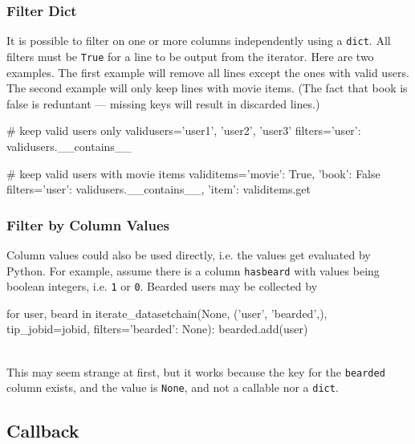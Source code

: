 \subsubsection*{Filter Dict}

It is possible to filter on one or more columns independently using a
\texttt{dict}.  All filters must be \texttt{True} for a line to be
output from the iterator.  Here are two examples.  The first example
will remove all lines except the ones with valid users.  The second
example will only keep lines with movie items.  (The fact that book is
false is reduntant --- missing keys will result in discarded lines.)

\begin{python}
# keep valid users only
validusers={'user1', 'user2', 'user3'}
filters={'user': validusers.__contains__}

# keep valid users with movie items
validitems={'movie': True, 'book': False}
filters={'user': validusers.__contains__, 'item': validitems.get}
\end{python}




\subsubsection*{Filter by Column Values}


Column values could also be used directly, i.e. the values get
evaluated by Python.  For example, assume there is a column
\texttt{hasbeard} with values being boolean integers, i.e.  \texttt{1}
or \texttt{0}.  Bearded users may be collected by
\\
\begin{python}
for user, beard in iterate_datasetchain(None, ('user', 'bearded',), tip_jobid=jobid,
                                       filters={'bearded': None}):
    bearded.add(user)
\end{python}
\\
This may seem strange at first, but it works because the key
for the \texttt{bearded} column exists, and the value is
\texttt{None}, and not a callable nor a \texttt{dict}.





    


\subsection{Callback}
\label{sec:callback}

